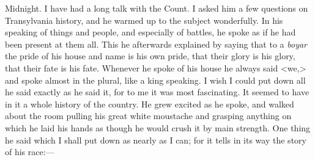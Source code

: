  
\begin{diary}{Midnight.} 
I have had a long talk with the Count. I asked him a few questions on Transylvania history, and he warmed up to the subject wonderfully. In his speaking of things and people, and especially of battles, he spoke as if he had been present at them all. This he afterwards explained by saying that to a \textit{boyar} the pride of his house and name is his own pride, that their glory is his glory, that their fate is his fate. Whenever he spoke of his house he always said <we,> and spoke almost in the plural, like a king speaking. I wish I could put down all he said exactly as he said it, for to me it was most fascinating. It seemed to have in it a whole history of the country. He grew excited as he spoke, and walked about the room pulling his great white moustache and grasping anything on which he laid his hands as though he would crush it by main strength. One thing he said which I shall put down as nearly as I can; for it tells in its way the story of his race:—


\end{diary}
